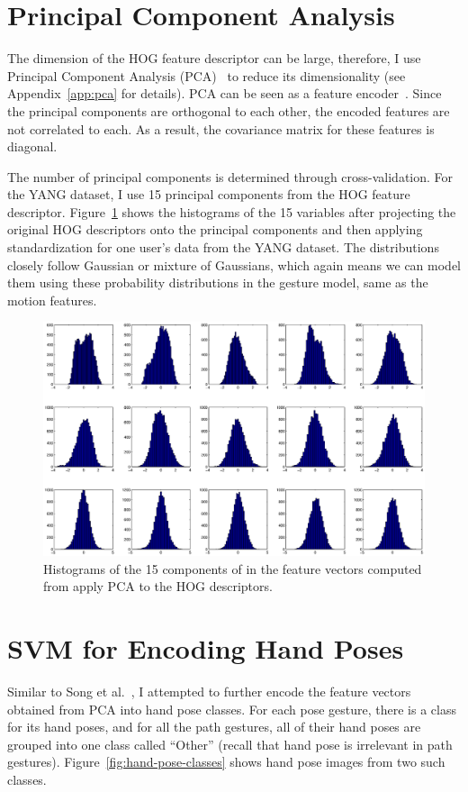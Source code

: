 \section{Principal Component Analysis}
The dimension of the HOG feature descriptor can be large, therefore, I use
Principal Component Analysis (PCA)~\cite{pca} to reduce its dimensionality (see
Appendix~\ref{app:pca} for details). PCA can be seen as a feature
encoder~\cite{ranzato07}. Since the principal components are orthogonal to each
other, the encoded features are not correlated to each. As a result, the
covariance matrix for these features is diagonal.

The number of principal components is determined through cross-validation. For
the YANG dataset, I use 15 principal components from the HOG feature descriptor.
Figure~\ref{fig:pca} shows the histograms of the 15
variables after projecting the original HOG descriptors onto the principal
components and then applying standardization for one user's data from the YANG
dataset. The distributions closely follow Gaussian or mixture of
Gaussians, which again means
we can model them using these probability distributions in the gesture
model, same as the motion features.

\begin{figure}[tbh]
\includegraphics[width=\columnwidth]{figures/hist_pca.eps}
\caption{Histograms of the 15 components of in the feature vectors computed
from apply PCA to the HOG descriptors.}
\label{fig:pca}
\end{figure}

\section{SVM for Encoding Hand Poses}
Similar to Song et al.~\cite{song12}, I attempted to further encode the feature
vectors obtained from PCA into hand pose classes. For each pose
gesture, there is a class for its hand poses, and for all the path
gestures, all of their hand poses are grouped into one class called ``Other''
(recall that hand pose is irrelevant in path gestures).
Figure~\ref{fig:hand-pose-classes} shows hand pose images from two such classes.

